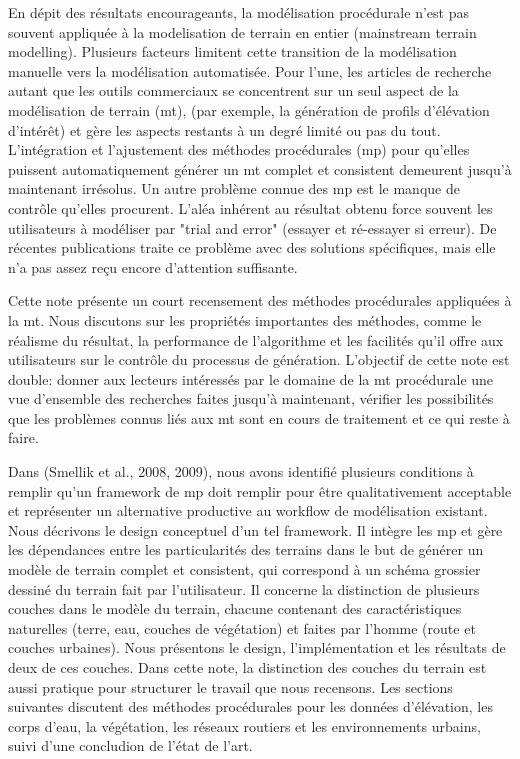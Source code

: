 \documentclass[11pt]{article}
\begin{document}
En dépit des résultats encourageants, la modélisation procédurale n'est pas souvent appliquée à la modelisation de terrain en entier (mainstream terrain modelling). Plusieurs facteurs limitent cette transition de la modélisation manuelle vers la modélisation automatisée. Pour l'une, les articles de recherche autant que les outils commerciaux se concentrent sur un seul aspect de la modélisation de terrain (mt), (par exemple, la génération de profils d'élévation d'intérêt) et gère les aspects restants à un degré limité ou pas du tout. L'intégration et l'ajustement des méthodes procédurales (mp) pour qu'elles puissent automatiquement générer un mt complet et consistent demeurent jusqu'à maintenant irrésolus. Un autre problème connue des mp est le manque de contrôle qu'elles procurent. L'aléa inhérent au résultat obtenu force souvent les utilisateurs à modéliser par "trial and error" (essayer et ré-essayer si erreur). De récentes publications traite ce problème avec des solutions spécifiques, mais elle n'a pas assez reçu encore d'attention suffisante. \newline

Cette note présente un court recensement des méthodes procédurales appliquées à la mt. Nous discutons sur les propriétés importantes des méthodes, comme le réalisme du résultat, la performance de l'algorithme et les facilités qu'il offre aux utilisateurs sur le contrôle du processus de génération. L'objectif de cette note est double: donner aux lecteurs intéressés par le domaine de la mt procédurale une vue d'ensemble des recherches faites jusqu'à maintenant, vérifier les possibilités que les problèmes connus liés aux mt sont en cours de traitement et ce qui reste à faire. \newline

Dans (Smellik et al., 2008, 2009), nous avons identifié plusieurs conditions à remplir qu'un framework de mp doit remplir pour être qualitativement acceptable et représenter un alternative productive au workflow de modélisation existant. Nous décrivons le design conceptuel d'un tel framework. Il intègre les mp et gère les dépendances entre les particularités des terrains dans le but de générer un modèle de terrain complet et consistent, qui correspond à un schéma grossier dessiné du terrain fait par l'utilisateur. Il concerne la distinction de plusieurs couches dans le modèle du terrain, chacune contenant des caractéristiques naturelles (terre, eau, couches de végétation) et faites par l'homme (route et couches urbaines). Nous présentons le design, l'implémentation et les résultats de deux de ces couches. Dans cette note, la distinction des couches du terrain est aussi pratique pour  structurer le travail que nous recensons.
Les sections suivantes discutent des méthodes procédurales pour les données d'élévation, les corps d'eau, la végétation, les réseaux routiers et les environnements urbains, suivi d'une concludion de l'état de l'art.  
\end{document}
